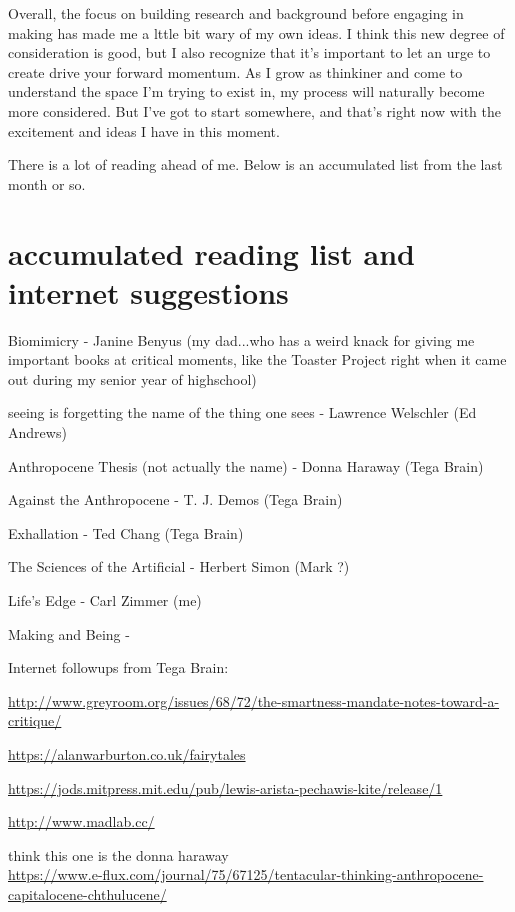 \documentclass[11pt]{report}
\begin{document}
Overall, the focus on building research and background before engaging in making has made me a lttle bit wary of my own ideas. I think this new degree of consideration is good, but I also recognize that it's important to let an urge to create drive your forward momentum. As I grow as thinkiner and come to understand the space I'm trying to exist in, my process will naturally become more considered. But I've got to start somewhere, and that's right now with the excitement and ideas I have in this moment. 


There is a lot of reading ahead of me. Below is an accumulated list from the last month or so.

\section*{accumulated reading list and internet suggestions}

Biomimicry - Janine Benyus (my dad...who has a weird knack for giving me important books at critical moments, like the Toaster Project right when it came out during my senior year of highschool)

seeing is forgetting the name of the thing one sees - Lawrence Welschler (Ed Andrews)

Anthropocene Thesis (not actually the name) - Donna Haraway (Tega Brain)

Against the Anthropocene - T. J. Demos (Tega Brain)

Exhallation - Ted Chang (Tega Brain)

The Sciences of the Artificial - Herbert Simon (Mark ?)

Life's Edge - Carl Zimmer (me)

Making and Being - 


\vspace{1cm}
Internet followups from Tega Brain:

\url{http://www.greyroom.org/issues/68/72/the-smartness-mandate-notes-toward-a-critique/}

\url{https://alanwarburton.co.uk/fairytales} 

\url{https://jods.mitpress.mit.edu/pub/lewis-arista-pechawis-kite/release/1}

\url{http://www.madlab.cc/}

think this one is the donna haraway\\
\url{https://www.e-flux.com/journal/75/67125/tentacular-thinking-anthropocene-capitalocene-chthulucene/}
\end{document}
